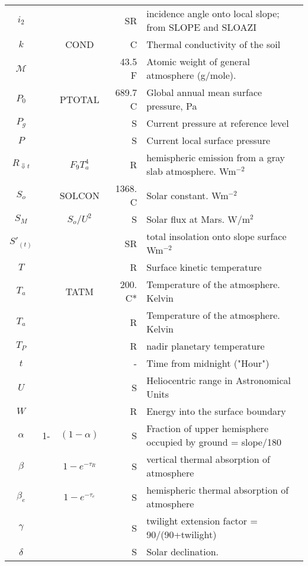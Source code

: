 \documentclass{article}
\begin{document}
\begin{table}[ht]
\begin{center}
\begin{tabular}{ c c c r l }
$i_2$   & \ct{} &   & SR &  incidence angle onto local slope;
                          from SLOPE and SLOAZI \\
$k$  & \ct{COND} &  COND   &  C & Thermal conductivity of the soil \\
$\mathcal{M}$ & \ct{AMW} &   & 43.5 \ F & Atomic weight of general atmosphere
                        (g/mole). \\ 
$P_0$    & \ct{PTOTAL}    &  PTOTAL  & 689.7 \ C & Global annual mean surface
pressure, Pa \\
$P_g$   & \ct{PZREF} &  & S  & Current pressure at reference level\\
$P$  & \ct{PRES} &   & S & Current local surface pressure \\
$R_{\Downarrow t} $   & \ct{ATMRAD} &  $ F_9 T_a^4 $   & R &  hemispheric 
        emission from a gray slab atmosphere.  Wm$^{-2}$\\
$S_o$   & \ct{SOLCON} & SOLCON & 1368. \ C  & Solar constant. Wm$^{-2}$ \\
$S_M$   & \ct{SOL} & $S_o/U^2$   &  S & Solar flux at Mars. W/m$^2$ \\
$S'_{(t)}$   & \ct{ASOL} &   & SR & total insolation onto slope surface  Wm$^{-2}$\\
$T$   & \ct{TSUR} &   & R & Surface kinetic temperature\\
$T_a$   & \ct{TATM} & TATM   & 200. \ C* & Temperature of the atmosphere. Kelvin \\ 
$T_a$   & \ct{TATMJ} &    & R & Temperature of the atmosphere. Kelvin \\
$T_P$   & \ct{TPFH} &   & R & nadir planetary temperature \\
$t$   & \ct{} &   & - & Time from midnight ("Hour") \\
$U$   & \ct{DAU} &   & S & Heliocentric range in Astronomical Units\\
$W$   & \ct{POWER} &   & R  & Energy into the surface boundary\\
$\alpha$  & 1-\ct{SKYFAC} & $(1-\alpha) $  & S & Fraction of upper hemisphere occupied by ground = slope/180  \\
$\beta$   & \ct{BETA} & $ 1-e^{-\tau_R}$   & S & vertical thermal absorption of atmosphere \\
$\beta_e$   & \ct{BETH} & $ 1-e^{-\tau_e}$  &  S & hemispheric thermal absorption of atmosphere \\
$\gamma$   & \ct{TWILFAC} &   & S & twilight extension factor =
90/(90+twilight)\\
$\delta$ & \ct{[R]SDEC} &   & S & Solar declination. \\

\end{tabular}
\end{center}
\end{table}
\end{document}
